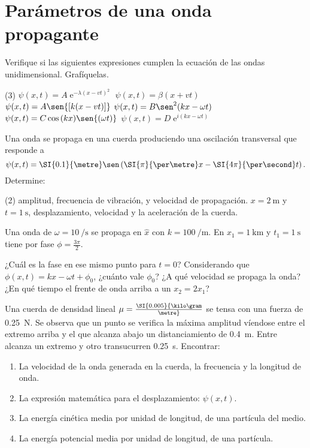 \section*{Parámetros de una onda propagante}


\item Verifique si las siguientes expresiones cumplen la ecuación de las ondas unidimensional.
Grafíquelas.
\begin{tasks}(3)
	\task $\psi(x,t)= A \operatorname{e}^{- \lambda ( x - v t)^2 }$
	\task $\psi(x,t)= \beta ( x + v t )$
	\task $\psi(x,t)= A \sen{\left[ k (x - v t) \right] }$
	\task $\psi(x,t)= B \sen^2{ \left( k x -\omega t \right) }$
	\task $\psi(x,t)= C \cos{(k x)} \sen{ \left( \omega t \right) }$
	\task $\psi(x,t)= D \operatorname{e}^{i ( k x - \omega t ) }$
\end{tasks}



\item Una onda se propaga en una cuerda produciendo una oscilación transversal que responde a 
\[
\psi(x,t) = \SI{0.1}{\metre} \sen \left( \SI{\pi}{\per\metre} x - \SI{4 \pi}{\per\second} t \right).
\]
Determine:
\begin{tasks}(2)
	\task amplitud,
	\task frecuencia de vibración, y
	\task velocidad de propagación.
	\task $x = \SI{2}{\metre}$ y $ t = \SI{1}{\second}$, desplazamiento, velocidad y la aceleración de la cuerda.
\end{tasks}



\item Una onda de $\omega= \SI{10}{\per\second}$ se propaga en $\hat{x}$ con $k = \SI{100}{\per\metre}$.
En $x_1 = \SI{1}{\kilo\metre}$ y $t_1 = \SI{1}{\second}$ tiene por fase $\phi = \frac{3 \pi}{2}$.
\begin{tasks}
	\task ¿Cuál es la fase en ese mismo punto para $t = 0$?
	\task Considerando que $\phi(x,t) = k x - \omega t+ \phi_0$, ¿cuánto vale $\phi_0$?
	\task ¿A qué velocidad se propaga la onda?
	\task ¿En qué tiempo el frente de onda arriba a un $x_2 = 2 x_1$?
\end{tasks}



\item Una cuerda de densidad lineal $\mu = \SI{0.005}{\kilo\gram\over\metre}$ se tensa con una fuerza de \SI{0.25}{\newton}.
Se observa que un punto se verifica la máxima amplitud víendose entre el extremo arriba y el que alcanza abajo un distanciamiento de \SI{0.4}{\metre}.
Entre alcanza un extremo y otro transucurren \SI{0.25}{\second}.
Encontrar:
\begin{enumerate}
	\item La velocidad de la onda generada en la cuerda, la frecuencia y la longitud de onda.
	\item La expresión matemática para el desplazamiento: $\psi(x,t)$.
	\item La energía cinética media por unidad de longitud, de una partícula del medio.
	\item La energía potencial media por unidad de longitud, de una partícula.
\end{enumerate}
